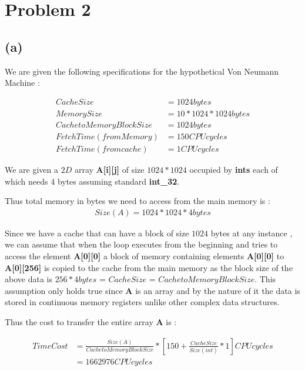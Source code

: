 \documentclass[a4paper,11pt]{article}
\theoremstyle{mytheor}
\begin{document}
\vspace*{2cm}
\section{Problem 2}

\subsection{(a)}

We are given the following specifications for the hypothetical Von Neumann Machine : 

\begin{align*}
Cache Size &=  1024 bytes \\
Memory Size &= 10 * 1024 * 1024 bytes  \\
Cache to Memory Block Size &=  1024 bytes\\
Fetch Time (from Memory) &= 150 CPU cycles \\
Fetch Time (from cache) &= 1 CPU cycles 
\end{align*}

We are given a $2D$ array \textbf{A[i][j]} of size $1024 *1024$ occupied by \textbf{ints} each of which needs 4 bytes assuming standard \textbf{int\_32}. 

Thus total memory in bytes we need to access from the main memory is : 
\begin{align*}
Size(A) = 1024 * 1024 * 4 bytes 
\end{align*}

Since we have a cache that can have a block of size $1024$ bytes at any instance , we can assume that when the loop executes from the beginning and tries to access the element \textbf{A[0][0]} a block of memory containing elements \textbf{A[0][0]} to \textbf{A[0][256]} is copied to the cache from the main memory as the block size of the above data is $256*4bytes$ = $Cache Size$ = $CachetoMemoryBlockSize$. This assumption only holds true since \textbf{A} is an array and by the nature of it the data is stored in continuous memory registers unlike other complex data structures.

Thus the cost to transfer the entire array \textbf{A} is :

\begin{align*}
Time Cost &= \frac{Size(A)}{Cache to Memory Block Size} * [150 + \frac{CacheSize}{Size(int)}*1 ] CPU cycles\\
&= 1662976 CPU cycles
\end{align*}
\end{document}
